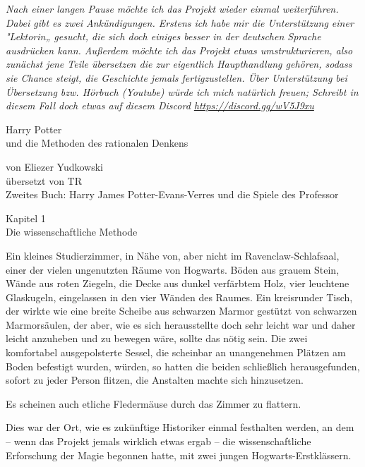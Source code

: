 

\hypertarget{die-wissenschaftliche-methode}{%

\emph{Nach einer langen Pause möchte ich das Projekt wieder einmal weiterführen. Dabei gibt es zwei Ankündigungen. Erstens ich habe mir die Unterstützung einer "Lektorin„ gesucht, die sich doch einiges besser in der deutschen Sprache ausdrücken kann. Außerdem möchte ich das Projekt etwas umstrukturieren, also zunächst jene Teile übersetzen die zur eigentlich Haupthandlung gehören, sodass sie Chance steigt, die Geschichte jemals fertigzustellen. Über Unterstützung bei Übersetzung bzw. Hörbuch (Youtube) würde ich mich natürlich freuen; Schreibt in diesem Fall doch etwas auf diesem Discord \url{https://discord.gg/wV5J9xu} ~}

Harry Potter\\ und die Methoden des rationalen Denkens

von Eliezer Yudkowski\\ übersetzt von TR\\ Zweites Buch: Harry James Potter-Evans-Verres und die Spiele des Professor

Kapitel 1\\ Die wissenschaftliche Methode

Ein kleines Studierzimmer, in Nähe von, aber nicht im Ravenclaw-Schlafsaal, einer der vielen ungenutzten Räume von Hogwarts. Böden aus grauem Stein, Wände aus roten Ziegeln, die Decke aus dunkel verfärbtem Holz, vier leuchtene Glaskugeln, eingelassen in den vier Wänden des Raumes. Ein kreisrunder Tisch, der wirkte wie eine breite Scheibe aus schwarzen Marmor gestützt von schwarzen Marmorsäulen, der aber, wie es sich herausstellte doch sehr leicht war und daher leicht anzuheben und zu bewegen wäre, sollte das nötig sein. Die zwei komfortabel ausgepolsterte Sessel, die scheinbar an unangenehmen Plätzen am Boden befestigt wurden, würden, so hatten die beiden schließlich herausgefunden, sofort zu jeder Person flitzen, die Anstalten machte sich hinzusetzen.

Es scheinen auch etliche Fledermäuse durch das Zimmer zu flattern.

Dies war der Ort, wie es zukünftige Historiker einmal festhalten werden, an dem -- wenn das Projekt jemals wirklich etwas ergab -- die wissenschaftliche Erforschung der Magie begonnen hatte, mit zwei jungen Hogwarts-Erstklässern.

}
